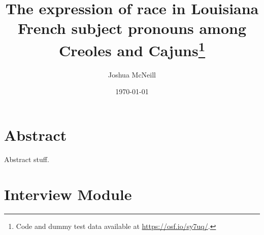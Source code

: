 \documentclass{book}\usepackage[]{graphicx}\usepackage[]{xcolor}
\title{The expression of race in Louisiana French subject pronouns among Creoles and Cajuns\footnote{
    Code and dummy test data available at \url{https://osf.io/sy7uq/}.
  }}
\author{Joshua McNeill}
\date{\today}
\newcommand{\abstract}[1]{
    \chapter*{\centering Abstract}
    #1
  }
\begin{document}
  \doublespacing
  \abstract{
    Abstract stuff.
  }

  \frontmatter
    \maketitle
    
    \tableofcontents

  \mainmatter
    
    
    
    
    
    

    \printbibliography

    \appendix
      \chapter{Interview Module}
        \label{app:module}
        

\end{document}
